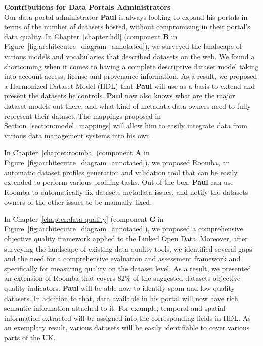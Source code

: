 \textbf{Contributions for Data Portals Administrators}
\vspace{1mm}
\\

Our data portal administrator \textbf{Paul} is always looking to expand his portals in terms of the number of datasets hosted, without compromising in their portal's data quality. In Chapter~\ref{chapter:hdl} (component \textbf{B} in Figure~\ref{fig:architecutre_diagram_annotated}), we surveyed the landscape of various models and vocabularies that described datasets on the web. We found a shortcoming when it comes to having a complete descriptive dataset model taking into account access, license and provenance information. As a result, we proposed a Harmonized Dataset Model (HDL) that \textbf{Paul} will use as a basis to extend and present the datasets he controls. \textbf{Paul} now also knows what are the major dataset models out there, and what kind of metadata data owners need to fully represent their dataset. The mappings proposed in Section~\ref{section:model_mappings} will allow him to easily integrate data from various data management systems into his own.

In Chapter~\ref{chapter:roomba} (component \textbf{A} in Figure~\ref{fig:architecutre_diagram_annotated}), we proposed Roomba, an automatic dataset profiles generation and validation tool that can be easily extended to perform various profiling tasks. Out of the box, \textbf{Paul} can use Roomba to automatically fix datasets metadata issues, and notify the datasets owners of the other issues to be manually fixed.

In Chapter~\ref{chapter:data-quality} (component \textbf{C} in Figure~\ref{fig:architecutre_diagram_annotated}), we proposed a comprehensive objective quality framework applied to the Linked Open Data. Moreover, after surveying the landscape of existing data quality tools, we identified several gaps and the need for a comprehensive evaluation and assessment framework and specifically for measuring quality on the dataset level. As a result, we presented an extension of Roomba that covers 82\% of the suggested datasets objective quality indicators. \textbf{Paul} will be able now to identify spam and low quality datasets. In addition to that, data available in his portal will now have rich semantic information attached to it. For example, temporal and spatial information extracted will be assigned into the corresponding fields in HDL. As an exemplary result, various datasets will be easily identifiable to cover various parts of the UK.\\

